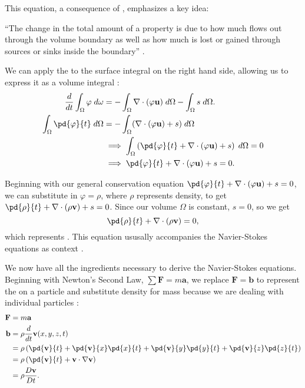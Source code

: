 \documentclass[12pt]{article}
\renewcommand{\vec}[1]{\mathbf{#1}}
\begin{document}
    This equation, a consequence of , emphasizes a key idea:
    \begin{idea}
        ``The change in the total amount of a property is due to how much flows out through the volume boundary as well as how much is lost or gained through sources or sinks inside the boundary'' \cite{derivation}.
    \end{idea}
    We can apply the  to the surface integral on the right hand side, allowing us to express it as a volume integral \cite{wikiderivation}:
    \begin{align*}
        \frac{d}{dt}\int_\Omega \varphi\;d\omega &=-\int_\Omega \nabla \cdot(\varphi\vec{u})\;d\Omega-\int_\Omega s\;d\Omega. \\
    \int_\Omega \pd{\varphi}{t}\;d\Omega &= -\int_\Omega (\nabla \cdot(\varphi\vec{u})+s)\;d\Omega \\
                                         &\implies \int_\Omega \left(\pd{\varphi}{t}+\nabla\cdot(\varphi\vec{u})+s\right)\;d\Omega =0\\
                                         &\implies \pd{\varphi}{t}+\nabla \cdot(\varphi\vec{u})+s=0
    .\end{align*}
    \begin{example}
        Beginning with our general conservation equation $\pd{\varphi}{t}+\nabla \cdot(\varphi\vec{u})+s=0$, we can substitute in $\varphi=\rho$, where $\rho$ represents density, to get $\pd{\rho}{t}+\nabla \cdot(\rho\vec{v})+s=0$. Since our volume $\Omega$ is constant, $s=0$, so we get
        \[ \pd{\rho}{t}+\nabla \cdot(\rho\vec{v})=0, \]
        which represents . This equation ususally accompanies the Navier-Stokes equations as context \cite{wikiderivation}.
    \end{example}
    We now have all the ingredients necessary to derive the Navier-Stokes equations. Beginning with Newton's Second Law, $\sum \vec{F}=m\vec{a}$, we replace  $\vec{F}=\vec{b}$ to represent the  on a particle and substitute density for mass because we are dealing with individual particles \cite{derivation}:
    \begin{align*}
        \vec{F}&=m\vec{a}\\
        \vec{b}&=\rho \frac{d}{dt} \vec{v}(x,y,z,t) \\
               &= \rho\left(\pd{\vec{v}}{t}+\pd{\vec{v}}{x}\pd{x}{t}+\pd{\vec{v}}{y}\pd{y}{t}+\pd{\vec{v}}{z}\pd{z}{t}\right) \\
               &= \rho\left(\pd{\vec{v}}{t}+\vec{v}\cdot\nabla \vec{v}\right) \\
               &= \rho \frac{D\vec{v}}{Dt}
    .\end{align*}
\end{document}
